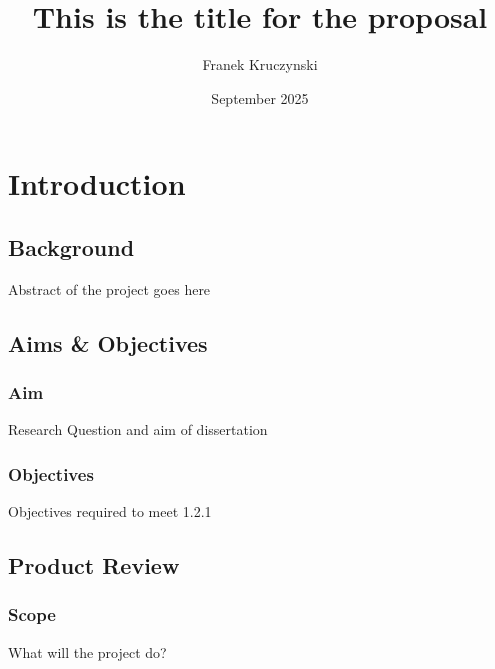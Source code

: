 \documentclass[a4paper,12pt,oneside]{book}			%
\title{\huge\bfseries This is the title for the proposal}
\author{Franek Kruczynski}
\date{September 2025}
\begin{document}
\frontmatter			%
\maketitle				%
\setcounter{page}{1}		%
\pagestyle{fancy}

\tableofcontents 			%

\mainmatter 			%
\clearpage			




\chapter{Introduction}\label{ch:intro}		%
\section{Background}\label{sec:background}	%

Abstract of the project goes here

\section{Aims \&{} Objectives}\label{sec:aimAndObjectives}
\subsection{Aim}\label{sec:aim}

Research Question and aim of dissertation 

\subsection{Objectives}\label{sec:objectives}

Objectives required to meet 1.2.1

\section{Product Review}\label{sec:productReview}

\subsection{Scope}\label{sec:scope}

What will the project do?
\end{document}
